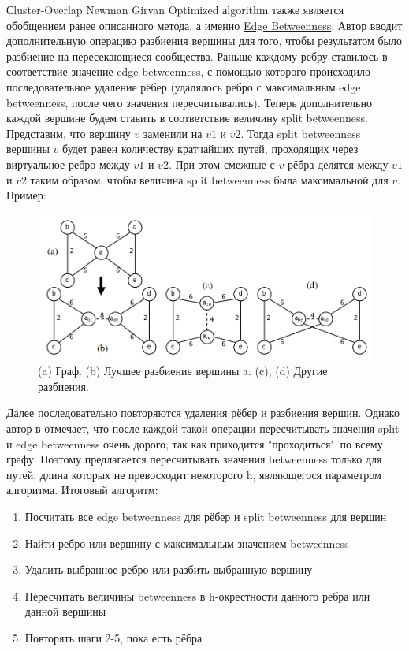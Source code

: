 \documentclass[12pt]{article}
\begin{document}
Сluster-Overlap Newman Girvan Optimized аlgorithm также является обобщением ранее описанного метода, а именно \hyperref[sec:edge_betweenness]{Edge Betweenness}. Автор вводит дополнительную операцию разбиения вершины для того, чтобы результатом было разбиение на пересекающиеся сообщества. Раньше каждому ребру ставилось в соответствие значение edge betweenness, с помощью которого происходило последовательное удаление рёбер (удалялось ребро с максимальным edge betweenness, после чего значения пересчитывались). Теперь дополнительно каждой вершине будем ставить в соответствие величину split betweenness. Представим, что вершину $v$ заменили на $v1$ и $v2$. Тогда split betweenness вершины $v$ будет равен количеству кратчайших путей, проходящих через виртуальное ребро между $v1$ и $v2$. При этом смежные с $v$ рёбра делятся между $v1$ и $v2$ таким образом, чтобы величина split betweenness была максимальной для $v$. Пример:
\begin{figure}[h]
	\begin{center}
		\includegraphics[scale=0.4]{pics/split_betweenness}
	\end{center}
	\caption{(a) Граф. (b) Лучшее разбиение вершины a. (c), (d) Другие разбиения.}
\end{figure}

Далее последовательно повторяются удаления рёбер и разбиения вершин. Однако автор в \cite{congo} отмечает, что после каждой такой операции пересчитывать значения split и edge betweenness очень дорого, так как приходится "проходиться"\ по всему графу. Поэтому предлагается пересчитывать значения betweenness только для путей, длина которых не превосходит некоторого h, являющегося параметром алгоритма.
Итоговый алгоритм:
\begin{enumerate}
\item Посчитать все edge betweenness для рёбер и split betweenness для вершин
\item Найти ребро или вершину с максимальным значением betweenness
\item Удалить выбранное ребро или разбить выбранную вершину
\item Пересчитать величины betweenness в h-окрестности данного ребра или данной вершины
\item Повторять шаги 2-5, пока есть рёбра
\end{enumerate}
\end{document}
